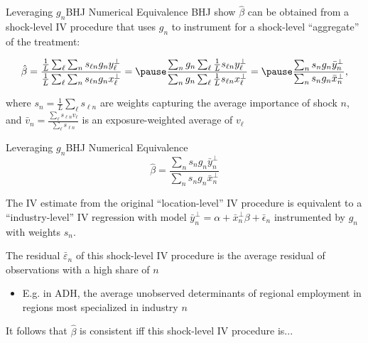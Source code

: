 \documentclass[t]{beamer}
\begin{document}
\begin{frame}{Leveraging $g_n$}{BHJ Numerical Equivalence}
\vspace{-0.2cm}
 BHJ show $\hat{\beta}$ can be obtained from a %
shock-level IV procedure that uses $g_n$ to instrument for a shock-level ``aggregate'' of the treatment:\pause

\begin{align*}
\hat{\beta}=\frac{\frac{1}{L}\sum_\ell \sum_n s_{\ell n} g_n y_\ell^\perp}{\frac{1}{L}\sum_\ell \sum_n s_{\ell n} g_n x_\ell^\perp}=\pause\frac{\sum_n g_n \sum_\ell\frac{1}{L}  s_{\ell n} y_\ell^\perp}{\sum_n g_n\sum_\ell\frac{1}{L}  s_{\ell n}  x_\ell^\perp}=\pause\frac{\sum_n s_n g_n \bar{y}_n^\perp}{\sum_n s_n g_n \bar{x}_n^\perp},
\end{align*}

\vspace{2.5mm}
where $s_n=\frac{1}{L}\sum_\ell s_{\ell n}$ are weights capturing the average importance of shock $n$, and $\bar{v}_n=\frac{\sum_\ell s_{\ell n} v_\ell}{\sum_\ell s_{\ell n}}$ is an exposure-weighted average of $v_\ell$
\end{frame}


\begin{frame}{Leveraging $g_n$}{BHJ Numerical Equivalence}
\vspace{-7.5mm}
$$
\hat{\beta}= \frac{\sum_n s_n g_n \bar{y}_n^\perp}{\sum_n s_n g_n \bar{x}_n^\perp}
$$

\vspace{2.5mm}
The IV estimate from the original ``location-level'' IV procedure is equivalent to a ``industry-level'' IV regression with model $\bar{y}_n^\perp = \alpha + \bar{x}_n^\perp \beta + \bar{\epsilon}_n$ instrumented by $g_n$ with weights $s_n$.
\medskip

The residual $\bar\varepsilon_n$ of this shock-level IV procedure is the average residual of observations with a high share of $n$
\begin{itemize}
  \item E.g. in ADH, the average unobserved determinants of regional employment in regions most specialized in industry $n$
\end{itemize}

\pause
It follows that $\hat{\beta}$ is consistent iff this shock-level IV procedure is...

\end{frame}
\end{document}
